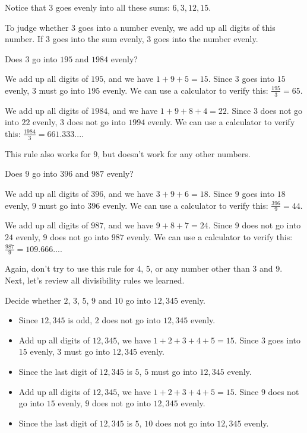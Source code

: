 Notice that $3$ goes evenly into all these sums: $6,3,12,15$.

To judge whether $3$ goes into a number evenly, we add up all digits of this number. If $3$ goes into the sum evenly, $3$ goes into the number evenly.

\begin{myexample}
Does $3$ go into $195$ and $1984$ evenly?
\end{myexample}
\begin{solution}
We add up all digits of $195$, and we have $1+9+5=15$. Since $3$ goes into $15$ evenly, $3$ must go into $195$ evenly. We can use a calculator to verify this: $\frac{195}{3}=65$.

We add up all digits of $1984$, and we have $1+9+8+4=22$. Since $3$ does not go into $22$ evenly, $3$ does not go into $1994$ evenly. We can use a calculator to verify this: $\frac{1984}{3}=661.333...$.
\end{solution}

This rule also works for $9$, but doesn't work for any other numbers.

\begin{myexample}
Does $9$ go into $396$ and $987$ evenly?
\end{myexample}
\begin{solution}
We add up all digits of $396$, and we have $3+9+6=18$. Since $9$ goes into $18$ evenly, $9$ must go into $396$ evenly. We can use a calculator to verify this: $\frac{396}{9}=44$.

We add up all digits of $987$, and we have $9+8+7=24$. Since $9$ does not go into $24$ evenly, $9$ does not go into $987$ evenly. We can use a calculator to verify this: $\frac{987}{9}=109.666...$.
\end{solution}

Again, don't try to use this rule for $4$, $5$, or any number other than $3$ and $9$. Next, let's review all divisibility rules we learned.

\begin{myexample}
Decide whether $2$, $3$, $5$, $9$ and $10$ go into $12,345$ evenly.
\end{myexample}
\begin{solution}
\begin{itemize}
\item Since $12,345$ is odd, $2$ does not go into $12,345$ evenly.
\item Add up all digits of $12,345$, we have $1+2+3+4+5=15$. Since $3$ goes into $15$ evenly, $3$ must go into $12,345$ evenly.
\item Since the last digit of $12,345$ is $5$, $5$ must go into $12,345$ evenly.
\item Add up all digits of $12,345$, we have $1+2+3+4+5=15$. Since $9$ does not go into $15$ evenly, $9$ does not go into $12,345$ evenly.
\item Since the last digit of $12,345$ is $5$, $10$ does not go into $12,345$ evenly.
\end{itemize}
\end{solution}

